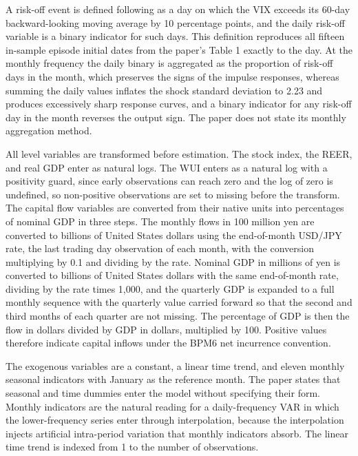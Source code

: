 A risk-off event is defined following \textcite{debock_carvalhofilho_2013} as a day on which the VIX exceeds its 60-day backward-looking moving average by 10 percentage points, and the daily risk-off variable is a binary indicator for such days. This definition reproduces all fifteen in-sample episode initial dates from the paper's Table 1 exactly to the day. At the monthly frequency the daily binary is aggregated as the proportion of risk-off days in the month, which preserves the signs of the impulse responses, whereas summing the daily values inflates the shock standard deviation to 2.23 and produces excessively sharp response curves, and a binary indicator for any risk-off day in the month reverses the output sign. The paper does not state its monthly aggregation method.

All level variables are transformed before estimation. The stock index, the REER, and real GDP enter as natural logs. The WUI enters as a natural log with a positivity guard, since early observations can reach zero and the log of zero is undefined, so non-positive observations are set to missing before the transform. The capital flow variables are converted from their native units into percentages of nominal GDP in three steps. The monthly flows in 100 million yen are converted to billions of United States dollars using the end-of-month USD/JPY rate, the last trading day observation of each month, with the conversion multiplying by 0.1 and dividing by the rate. Nominal GDP in millions of yen is converted to billions of United States dollars with the same end-of-month rate, dividing by the rate times 1,000, and the quarterly GDP is expanded to a full monthly sequence with the quarterly value carried forward so that the second and third months of each quarter are not missing. The percentage of GDP is then the flow in dollars divided by GDP in dollars, multiplied by 100. Positive values therefore indicate capital inflows under the BPM6 net incurrence convention.

The exogenous variables are a constant, a linear time trend, and eleven monthly seasonal indicators with January as the reference month. The paper states that seasonal and time dummies enter the model without specifying their form. Monthly indicators are the natural reading for a daily-frequency VAR in which the lower-frequency series enter through interpolation, because the interpolation injects artificial intra-period variation that monthly indicators absorb. The linear time trend is indexed from 1 to the number of observations.


